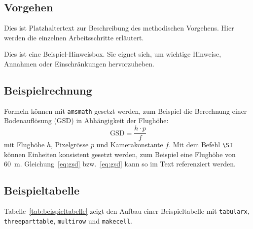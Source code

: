 \subsection{Vorgehen}
\label{subsec:vorgehen}
Dies ist Platzhaltertext zur Beschreibung des methodischen Vorgehens. Hier werden die
einzelnen Arbeitsschritte erläutert.

\begin{tcolorbox}[myboxstyle, title=Hinweis]
Dies ist eine Beispiel-Hinweisbox. Sie eignet sich, um wichtige
Hinweise, Annahmen oder Einschränkungen hervorzuheben.
\end{tcolorbox}

\subsection{Beispielrechnung}
\label{subsec:beispielrechnung}
Formeln können mit \texttt{amsmath} gesetzt werden, zum Beispiel die Berechnung einer
Bodenauflösung (GSD) in Abhängigkeit der Flughöhe:
\begin{equation}
    \text{GSD} = \frac{h \cdot p}{f}
    \label{eq:gsd}
\end{equation}
mit Flughöhe $h$, Pixelgrösse $p$ und Kamerakonstante $f$. Mit dem Befehl \texttt{\textbackslash SI}
können Einheiten konsistent gesetzt werden, zum Beispiel eine Flughöhe von \SI{60}{\meter}.
Gleichung~\ref{eq:gsd} bzw.\ \cref{eq:gsd} kann so im Text referenziert werden.

\subsection{Beispieltabelle}
\label{subsec:beispieltabelle}
Tabelle~\ref{tab:beispieltabelle} zeigt den Aufbau einer Beispieltabelle mit
\texttt{tabularx}, \texttt{threeparttable}, \texttt{multirow} und \texttt{makecell}.

